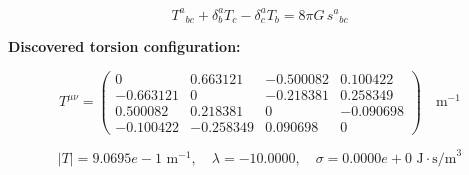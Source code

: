 
\begin{equation}
  T^a{}_{bc} + \delta^a_b T_c - \delta^a_c T_b = 8\pi G \, s^a{}_{bc}
\end{equation}

\textbf{Discovered torsion configuration:}

\begin{equation}
  T^{\mu\nu} = \begin{pmatrix}
    0 & 0.663121 & -0.500082 & 0.100422 \\
    -0.663121 & 0 & -0.218381 & 0.258349 \\
    0.500082 & 0.218381 & 0 & -0.090698 \\
    -0.100422 & -0.258349 & 0.090698 & 0
  \end{pmatrix} \quad \text{m}^{-1}
\end{equation}

\begin{equation}
  |T| = 9.0695e-1 \text{ m}^{-1}, \quad
  \lambda = -10.0000, \quad
  \sigma = 0.0000e+0 \text{ J}\cdot\text{s/m}^3
\end{equation}